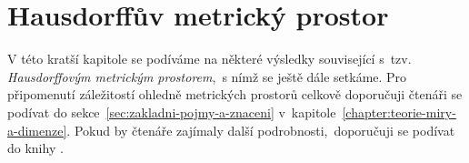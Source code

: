 \chapter{Hausdorffův metrický prostor}\label{chapter:hausdorffuv-mp}

V této kratší kapitole se podíváme na některé výsledky související s~tzv. \emph{Hausdorffovým metrickým prostorem},~s nímž se ještě dále setkáme. Pro připomenutí záležitostí ohledně metrických prostorů celkově doporučuji čtenáři se podívat do sekce~\ref{sec:zakladni-pojmy-a-znaceni} v~kapitole~\ref{chapter:teorie-miry-a-dimenze}. Pokud by čtenáře zajímaly další podrobnosti,~doporučuji se podívat do knihy \citep[str. 71]{Edgar2008}.


